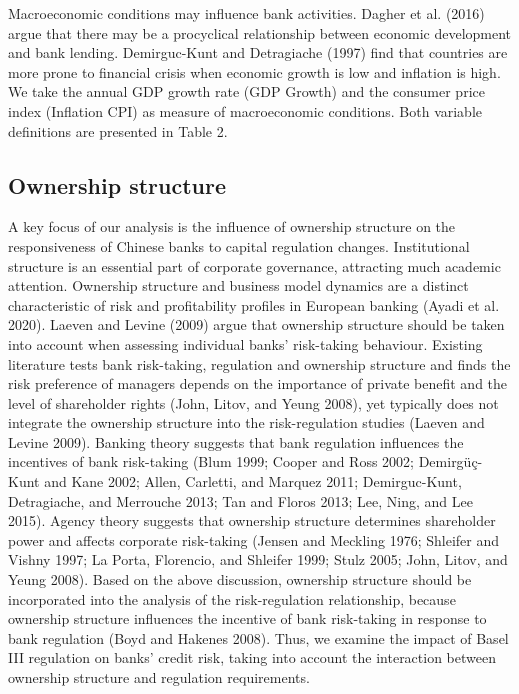 \documentclass{article}
\begin{document}
Macroeconomic conditions may influence bank activities. Dagher et al.
(2016) argue that there may be a procyclical relationship between
economic development and bank lending. Demirguc-Kunt and Detragiache
(1997) find that countries are more prone to financial crisis when
economic growth is low and inflation is high. We take the annual GDP
growth rate (GDP Growth) and the consumer price index (Inflation CPI) as
measure of macroeconomic conditions. Both variable definitions are
presented in Table 2.

\hypertarget{ownership-structure}{%
\subsection{Ownership structure}\label{ownership-structure}}

A key focus of our analysis is the influence of ownership structure on
the responsiveness of Chinese banks to capital regulation changes.
Institutional structure is an essential part of corporate governance,
attracting much academic attention. Ownership structure and business
model dynamics are a distinct characteristic of risk and profitability
profiles in European banking (Ayadi et al. 2020). Laeven and Levine
(2009) argue that ownership structure should be taken into account when
assessing individual banks' risk-taking behaviour. Existing literature
tests bank risk-taking, regulation and ownership structure and finds the
risk preference of managers depends on the importance of private benefit
and the level of shareholder rights (John, Litov, and Yeung 2008), yet
typically does not integrate the ownership structure into the
risk-regulation studies (Laeven and Levine 2009). Banking theory
suggests that bank regulation influences the incentives of bank
risk-taking (Blum 1999; Cooper and Ross 2002; Demirgüç-Kunt and Kane
2002; Allen, Carletti, and Marquez 2011; Demirguc-Kunt, Detragiache, and
Merrouche 2013; Tan and Floros 2013; Lee, Ning, and Lee 2015). Agency
theory suggests that ownership structure determines shareholder power
and affects corporate risk-taking (Jensen and Meckling 1976; Shleifer
and Vishny 1997; La Porta, Florencio, and Shleifer 1999; Stulz 2005;
John, Litov, and Yeung 2008). Based on the above discussion, ownership
structure should be incorporated into the analysis of the
risk-regulation relationship, because ownership structure influences the
incentive of bank risk-taking in response to bank regulation (Boyd and
Hakenes 2008). Thus, we examine the impact of Basel III regulation on
banks' credit risk, taking into account the interaction between
ownership structure and regulation requirements.
\end{document}
